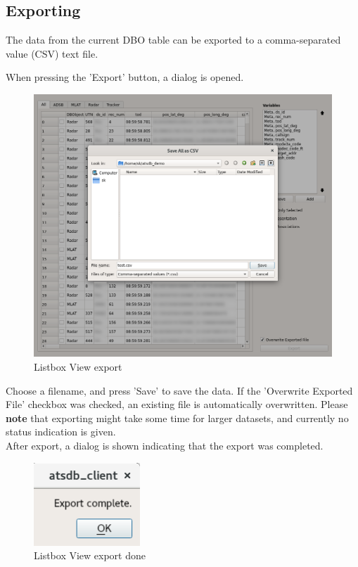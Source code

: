 \subsection{Exporting}
\label{sec:exporting}

The data from the current DBO table can be exported to a comma-separated value (CSV) text file. 

When pressing the 'Export' button, a dialog is opened.

\begin{figure}[H]
    \hspace*{-2cm}
    \includegraphics[width=18cm,frame]{../screenshots/listbox_export.png}
  \caption{Listbox View export}
  \label{fig:listbox_export}
\end{figure}

Choose a filename, and press 'Save' to save the data. If the 'Overwrite Exported File' checkbox was checked, an existing file is automatically overwritten. Please \textbf{note} that exporting might take some time for larger datasets, and currently no status indication is given.\\

After export, a dialog is shown indicating that the export was completed.

\begin{figure}[H]
    \includegraphics[width=4cm,frame]{../screenshots/listbox_exported.png}
  \caption{Listbox View export done}
  \label{fig:listbox_exported}
\end{figure}

